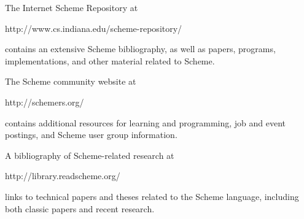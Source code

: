 
The Internet Scheme Repository at
\begin{center}
{\cf http://www.cs.indiana.edu/scheme-repository/}
\end{center}
contains an extensive Scheme bibliography, as well as papers,
programs, implementations, and other material related to Scheme.

The Scheme community website at
\begin{center}
{\cf http://schemers.org/}
\end{center}
contains additional resources for learning and programming, job and
event postings, and Scheme user group information.

A bibliography of Scheme-related research at
\begin{center}
{\cf http://library.readscheme.org/}
\end{center}
links to technical papers and theses related to the Scheme language,
including both classic papers and recent research.
